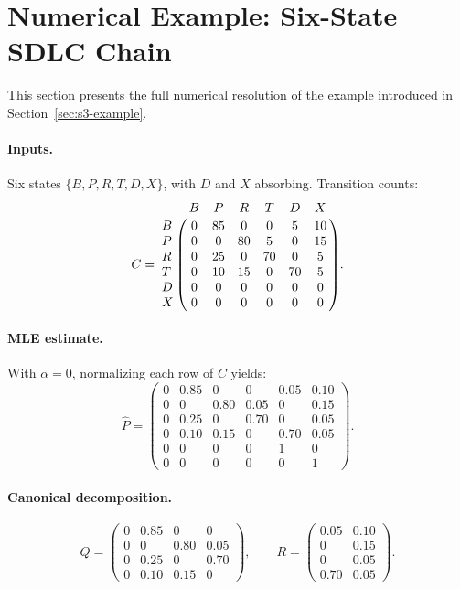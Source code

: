 \section{Numerical Example: Six-State SDLC Chain}
\label{app:A-numerical}

This section presents the full numerical resolution of the example
introduced in Section~\ref{sec:s3-example}.

\paragraph{Inputs.} Six states $\{B, P, R, T, D, X\}$, with $D$ and $X$
absorbing. Transition counts:
\begin{equation}
C = \bordermatrix{
    & B & P & R & T & D & X \cr
  B & 0 & 85 & 0 & 0 & 5 & 10 \cr
  P & 0 & 0 & 80 & 5 & 0 & 15 \cr
  R & 0 & 25 & 0 & 70 & 0 & 5 \cr
  T & 0 & 10 & 15 & 0 & 70 & 5 \cr
  D & 0 & 0 & 0 & 0 & 0 & 0 \cr
  X & 0 & 0 & 0 & 0 & 0 & 0 \cr}.
\end{equation}

\paragraph{MLE estimate.} With $\alpha = 0$, normalizing each row of $C$
yields:
\begin{equation}
\hat{P} = \begin{pmatrix}
0 & 0.85 & 0    & 0    & 0.05 & 0.10 \\
0 & 0    & 0.80 & 0.05 & 0    & 0.15 \\
0 & 0.25 & 0    & 0.70 & 0    & 0.05 \\
0 & 0.10 & 0.15 & 0    & 0.70 & 0.05 \\
0 & 0    & 0    & 0    & 1    & 0    \\
0 & 0    & 0    & 0    & 0    & 1
\end{pmatrix}.
\end{equation}

\paragraph{Canonical decomposition.}
\begin{equation}
Q = \begin{pmatrix}
0 & 0.85 & 0    & 0    \\
0 & 0    & 0.80 & 0.05 \\
0 & 0.25 & 0    & 0.70 \\
0 & 0.10 & 0.15 & 0
\end{pmatrix}, \qquad
R = \begin{pmatrix}
0.05 & 0.10 \\
0    & 0.15 \\
0    & 0.05 \\
0.70 & 0.05
\end{pmatrix}.
\end{equation}

